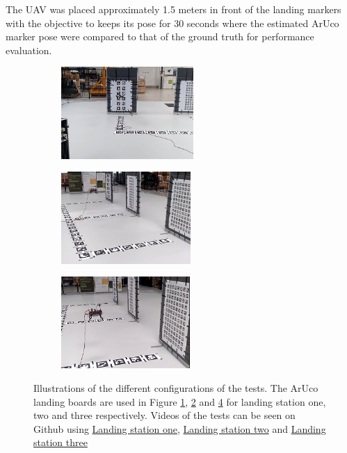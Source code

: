 \documentclass[../Head/report.tex]{subfiles}
\begin{document}
The UAV was placed approximately 1.5 meters in front of the landing markers with the objective to keeps its pose for 30 seconds where the estimated ArUco marker pose were compared to that of the ground truth for performance evaluation.

\begin{figure}[H]
    \centering
    \begin{subfigure}[t]{.31\textwidth}
        \centering
        \includegraphics[height=3.5cm]{../Figures/optitrack/hold_pose_using_estimated_aruco_pose_one.png}
        \caption{}
        \label{fig:optitrack_hold_pose_board_one}
    \end{subfigure}
    \begin{subfigure}[t]{.31\textwidth}
        \centering
        \includegraphics[height=3.5cm]{../Figures/optitrack/hold_pose_using_estimated_aruco_pose_two.png}
        \caption{}
        \label{fig:optitrack_hold_pose_board_two}
    \end{subfigure}
    \begin{subfigure}[t]{.31\textwidth}
        \centering
        \includegraphics[height=3.5cm]{../Figures/optitrack/hold_pose_using_estimated_aruco_pose_three.png}
        \caption{}
        \label{fig:optitrack_hold_pose_board_three}
    \end{subfigure}
    \caption{Illustrations of the different configurations of the tests. The ArUco landing boards are used in Figure \ref{fig:optitrack_hold_pose_board_one}, \ref{fig:optitrack_hold_pose_board_two} and \ref{fig:optitrack_hold_pose_board_three} for landing station one, two and three respectively. Videos of the tests can be seen on Github using \href{https://github.com/Kenil16/master_project/blob/master/test\_videos/optitrack/hold\_pose\_using\_estimated\_aruco\_pose\_one.mp4}{Landing station one}, \href{https://github.com/Kenil16/master_project/blob/master/test\_videos/optitrack/hold\_pose\_using\_estimated\_aruco\_pose\_two.mp4}{Landing station two} and \href{https://github.com/Kenil16/master_project/blob/master/test\_videos/optitrack/hold\_pose\_using\_estimated\_aruco\_pose\_three.mp4}{Landing station three}}

\end{figure}
\end{document}
